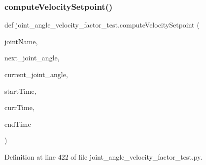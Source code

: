 \subsubsection{\texorpdfstring{computeVelocitySetpoint()}{computeVelocitySetpoint()}}
{\footnotesize\ttfamily def joint\+\_\+angle\+\_\+velocity\+\_\+factor\+\_\+test.\+compute\+Velocity\+Setpoint (\begin{DoxyParamCaption}\item[{}]{joint\+Name,  }\item[{}]{next\+\_\+joint\+\_\+angle,  }\item[{}]{current\+\_\+joint\+\_\+angle,  }\item[{}]{start\+Time,  }\item[{}]{curr\+Time,  }\item[{}]{end\+Time }\end{DoxyParamCaption})}



Definition at line 422 of file joint\+\_\+angle\+\_\+velocity\+\_\+factor\+\_\+test.\+py.


